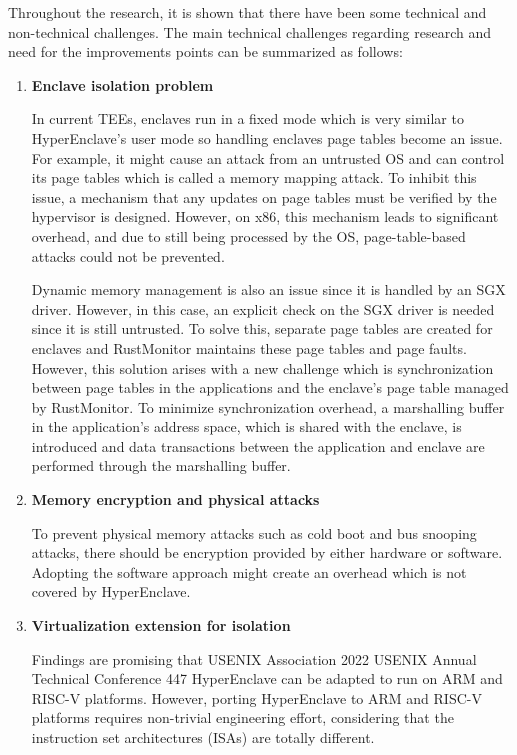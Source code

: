 Throughout the research, it is shown that there have been some technical and non-technical challenges. 
The main technical challenges regarding research and need for the improvements points can be summarized as follows:

\begin{enumerate}
    \item \textbf{Enclave isolation problem}

    In current TEEs, enclaves run in a fixed mode which is very similar to HyperEnclave’s user mode so handling enclaves page tables become an issue. For example, it might cause an attack from an untrusted OS and can control its page tables which is called a memory mapping attack. To inhibit this issue, a mechanism that any updates on page tables must be verified by the hypervisor is designed. However, on x86, this mechanism leads to significant overhead, and due to still being processed by the OS, page-table-based attacks could not be prevented.

    Dynamic memory management is also an issue since it is handled by an SGX driver. However, in this case, an explicit check on the SGX driver is needed since it is still untrusted.
    To solve this, separate page tables are created for enclaves and RustMonitor maintains these page tables and page faults. However, this solution arises with a new challenge which is synchronization between page tables in the applications and the enclave’s page table managed by RustMonitor. To minimize synchronization overhead, a marshalling buffer in the application’s address space, which is shared with the enclave, is introduced and data transactions between the application and enclave are performed through the marshalling buffer.

    \item \textbf{Memory encryption and physical attacks}
    
    To prevent physical memory attacks such as cold boot and bus snooping attacks, there should be encryption provided by either hardware or software. Adopting the software approach might create an overhead which is not covered by HyperEnclave.

    \item \textbf{Virtualization extension for isolation}
        
        Findings are promising that USENIX Association 2022 USENIX Annual Technical Conference 447 HyperEnclave can be adapted to run on ARM and RISC-V platforms. However, porting HyperEnclave to ARM and RISC-V platforms requires non-trivial engineering effort, considering that the instruction set architectures (ISAs) are totally different.
        

\end{enumerate}
